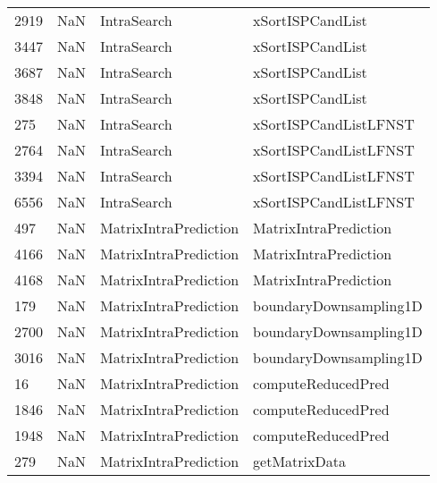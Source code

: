 \begin{tabular}{llll}
2919 &                   NaN &                IntraSearch &                          xSortISPCandList \\
3447 &                   NaN &                IntraSearch &                          xSortISPCandList \\
3687 &                   NaN &                IntraSearch &                          xSortISPCandList \\
3848 &                   NaN &                IntraSearch &                          xSortISPCandList \\
275  &                   NaN &                IntraSearch &                     xSortISPCandListLFNST \\
2764 &                   NaN &                IntraSearch &                     xSortISPCandListLFNST \\
3394 &                   NaN &                IntraSearch &                     xSortISPCandListLFNST \\
6556 &                   NaN &                IntraSearch &                     xSortISPCandListLFNST \\
497  &                   NaN &      MatrixIntraPrediction &                     MatrixIntraPrediction \\
4166 &                   NaN &      MatrixIntraPrediction &                     MatrixIntraPrediction \\
4168 &                   NaN &      MatrixIntraPrediction &                     MatrixIntraPrediction \\
179  &                   NaN &      MatrixIntraPrediction &                    boundaryDownsampling1D \\
2700 &                   NaN &      MatrixIntraPrediction &                    boundaryDownsampling1D \\
3016 &                   NaN &      MatrixIntraPrediction &                    boundaryDownsampling1D \\
16   &                   NaN &      MatrixIntraPrediction &                        computeReducedPred \\
1846 &                   NaN &      MatrixIntraPrediction &                        computeReducedPred \\
1948 &                   NaN &      MatrixIntraPrediction &                        computeReducedPred \\
279  &                   NaN &      MatrixIntraPrediction &                             getMatrixData \\

\end{tabular}

